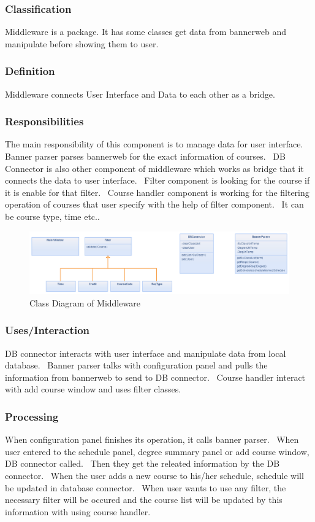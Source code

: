 \documentclass[twoside,letterpaper]{article}
\begin{document}
\subsubsection{Classification}
Middleware is a package. It has some classes get data from bannerweb and manipulate before showing them to user.
\subsubsection{Definition}
Middleware connects User Interface and Data to each other as a bridge.
\subsubsection{Responsibilities}
The main responsibility of this component is to manage data for user interface. Banner parser parses  bannerweb for the exact information of courses. \ DB Connector is also other component of middleware which works as bridge that it connects the data to user interface. \ Filter component is looking for the course if it is enable for that filter. \ Course handler component is working for the filtering operation of courses that user specify with the help of filter component. \ It can be course type, time etc..
\begin{figure}[h]
\centering
\includegraphics[width=\linewidth]{middleware.png}
\caption{Class Diagram of Middleware}
\end{figure}
\subsubsection{Uses/Interaction}
DB connector interacts with user interface and manipulate data from local database. \ Banner parser talks with configuration panel and pulls the information from bannerweb to send to DB connector. \ Course handler interact with add course window and uses filter classes.
\subsubsection{Processing}
When configuration panel finishes its operation, it calls banner parser. \ When user entered to the schedule panel, degree summary panel or add course window, DB connector called. \ Then they get the releated information by the DB connector. \ When the user adds a new course to his/her schedule, schedule will be updated in database connector. \ When user wants to use any filter, the necessary filter will be occured and the course list will be updated by this information with using course handler.
\end{document}
